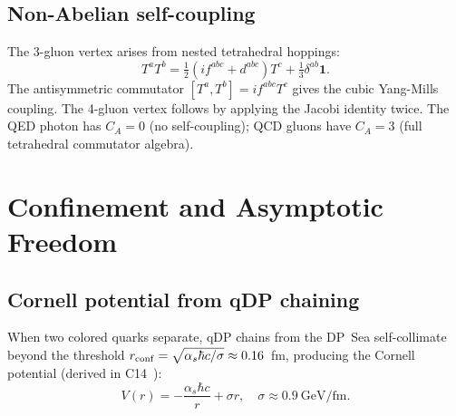 \documentclass[11pt,letterpaper]{article}
\newcommand{\as}{\alpha_s}
\begin{document}
\subsection{Non-Abelian self-coupling}

The 3-gluon vertex arises from nested tetrahedral hoppings:
\begin{equation}
T^aT^b = \tfrac{1}{2}(if^{abc}+d^{abc})T^c + \tfrac{1}{3}\delta^{ab}\mathbf{1}.
\label{eq:TaTb}
\end{equation}
The antisymmetric commutator $[T^a,T^b] = if^{abc}T^c$ gives the
cubic Yang-Mills coupling.  The 4-gluon vertex follows by applying
the Jacobi identity twice.  The QED photon has $C_A = 0$ (no
self-coupling); QCD gluons have $C_A = 3$ (full tetrahedral
commutator algebra).

\section{Confinement and Asymptotic Freedom}
\label{sec:confinement}

\subsection{Cornell potential from qDP chaining}

When two colored quarks separate, qDP chains from the DP~Sea
self-collimate beyond the threshold $r_{\rm conf} =
\sqrt{\as\hbar c/\sigma} \approx 0.16$~fm, producing the Cornell
potential (derived in C14~\citep{c14}):
\begin{equation}
V(r) = -\frac{\as\hbar c}{r} + \sigma r,\quad
\sigma \approx 0.9\ \text{GeV/fm}.
\label{eq:cornell}
\end{equation}
\end{document}
